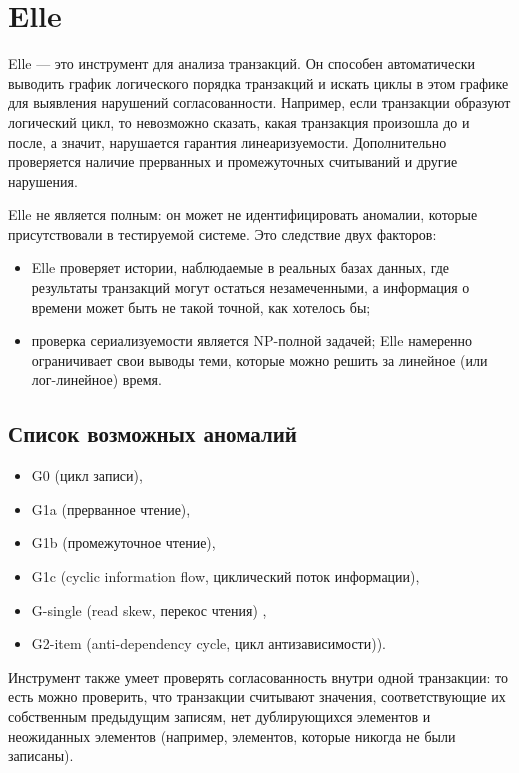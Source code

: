 \documentclass[12pt,  openany]{book}
\begin{document}
\section{Elle}
\par
Elle --- это инструмент для анализа транзакций. Он способен автоматически выводить график логического порядка транзакций и искать циклы в этом графике для выявления нарушений согласованности. Например, если транзакции образуют логический цикл, то невозможно сказать, какая транзакция произошла до и после, а значит, нарушается гарантия линеаризуемости. 
Дополнительно проверяется наличие прерванных и промежуточных считываний и другие нарушения.
\par
Elle не является полным: он может не идентифицировать аномалии, которые присутствовали в тестируемой системе. Это следствие двух факторов:
\begin{itemize}
\item Elle проверяет истории, наблюдаемые в реальных базах данных, где результаты транзакций могут остаться незамеченными, а информация о времени может быть не такой точной, как хотелось бы;
\item проверка сериализуемости является NP-полной задачей; Elle намеренно ограничивает свои выводы теми, которые можно решить за линейное (или лог-линейное) время.
\end{itemize}
\subsection{Список возможных аномалий}
\begin{itemize}
\item G0 (цикл записи), 
\item G1a (прерванное чтение), 
\item G1b (промежуточное чтение), 
\item G1c (cyclic information flow, циклический поток информации), 
\item G-single (read skew, перекос чтения) ,
\item G2-item (anti-dependency cycle, цикл антизависимости)).
\end{itemize}

\par Инструмент также умеет проверять согласованность внутри одной транзакции: то есть можно проверить, что транзакции считывают значения, соответствующие их собственным предыдущим записям, нет дублирующихся элементов и неожиданных элементов (например, элементов, которые никогда не были записаны).
\end{document}

